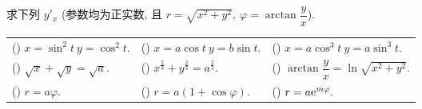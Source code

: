 \begin{example}
    求下列 $y'_x$ (参数均为正实数, 且 $r=\sqrt{x^2+y^2},~\varphi=\arctan\dfrac{y}{x}$).
    \setcounter{magicrownumbers}{0}
    \begin{table}[H]
        \centering
        \begin{tabular}{l | l | l}
            (\rownumber{}) $x=\sin^2t~  y=\cos^2t.$      & (\rownumber{}) $x=a\cos t~  y=b\sin t.$                           & (\rownumber{})  $x=a\cos^3t~  y=a\sin^3t.$               \\
            (\rownumber{}) $\sqrt{x}+\sqrt{y}=\sqrt{a}.$ & (\rownumber{}) $x^{\frac{2}{3}}+y^{\frac{2}{3}}=a^{\frac{2}{3}}.$ & (\rownumber{})  $\arctan\dfrac{y}{x}=\ln\sqrt{x^2+y^2}.$ \\
            (\rownumber{}) $r=a\varphi.$                 & (\rownumber{}) $r=a(1+\cos \varphi).$                             & (\rownumber{})  $r=a\mathrm{e} ^{m\varphi}.$
        \end{tabular}
    \end{table}
\end{example}

